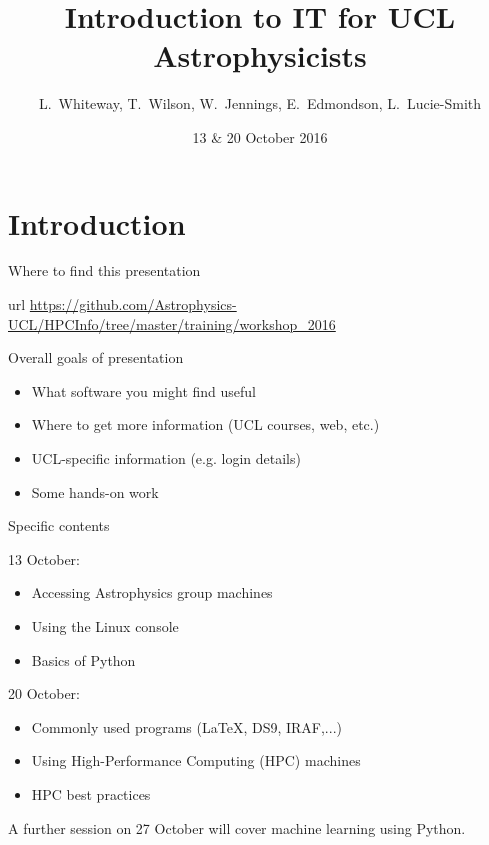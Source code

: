 \documentclass{beamer}
\title[IT Workshops] %
{Introduction to IT for UCL Astrophysicists}
\author{L.~Whiteway, T.~Wilson, W.~Jennings, E.~Edmondson, L.~Lucie-Smith}
\institute[UCL]
{
  Department of Physics and Astronomy\\
  University College London
}
\date[IT 2016]
{13 \& 20 October 2016}
\begin{document}
\frame{\titlepage}

\section{Introduction}

\begin{frame}{Where to find this presentation}
  \begin{block}{url}
    \url{https://github.com/Astrophysics-UCL/HPCInfo/tree/master/training/workshop_2016}
  \end{block}
\end{frame}


\begin{frame}{Overall goals of presentation}
  \begin{itemize}
    \item What software you might find useful
    \item Where to get more information (UCL courses, web, etc.)
    \item UCL-specific information (e.g. login details)
    \item Some hands-on work
  \end{itemize}
\end{frame}

\begin{frame}{Specific contents}

  \begin{block}{13 October:}
    \begin{itemize}
      \item Accessing Astrophysics group machines
      \item Using the Linux console
      \item Basics of Python
    \end{itemize}
  \end{block}
  
  \begin{block}{20 October:}
    \begin{itemize}
    \item Commonly used programs (LaTeX, DS9, IRAF,...)
    \item Using High-Performance Computing (HPC) machines
    \item HPC best practices
    \end{itemize}
  \end{block}
  
  \begin{block}{A further session on 27 October will cover machine learning using Python.}
  \end{block}

\end{frame}
\end{document}
